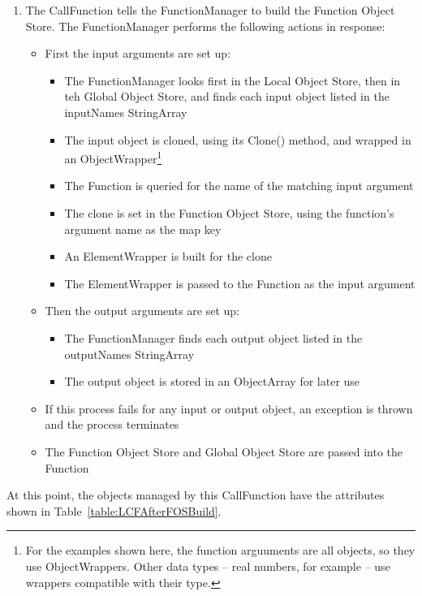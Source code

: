 \begin{enumerate}
\item The CallFunction tells the FunctionManager to build the Function Object Store.  The
FunctionManager performs the following actions in response:
\begin{itemize}
\item First the input arguments are set up:
\begin{itemize}
\item The FunctionManager looks first in the Local Object Store, then in teh Global Object Store,
and finds each input object listed in the inputNames StringArray
\item The input object is cloned, using its Clone() method, and wrapped in an
ObjectWrapper\footnote{For the examples shown here, the function arguuments are all objects, so
they use ObjectWrappers.  Other data types -- real numbers, for example -- use wrappers compatible
with their type.}
\item The Function is queried for the name of the matching input argument
\item The clone is set in the Function Object Store, using the function's argument name as the map
key
\item An ElementWrapper is built for the clone
\item The ElementWrapper is passed to the Function as the input argument
\end{itemize}
\item Then the output arguments are set up:
\begin{itemize}
\item The FunctionManager finds each output object listed in the outputNames StringArray
\item The output object is stored in an ObjectArray for later use
\end{itemize}
\item If this process fails for any input or output object, an exception is thrown and the process
terminates
\item The Function Object Store and Global Object Store are passed into the Function
\end{itemize}
\end{enumerate}

At this point, the objects managed by this CallFunction have the attributes shown in
Table~\ref{table:LCFAfterFOSBuild}.

